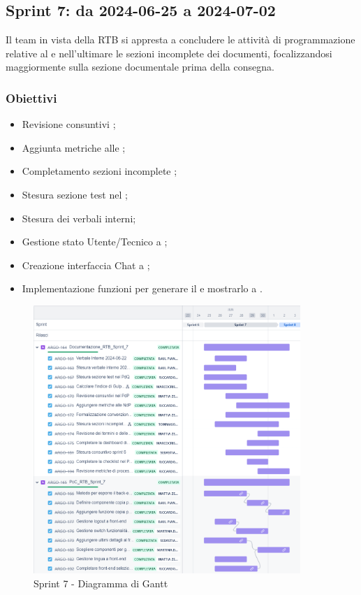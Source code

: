 \subsection{Sprint 7: da 2024-06-25 a 2024-07-02}
Il team in vista della RTB si appresta a concludere le attività di programmazione relative al  e nell'ultimare le sezioni incomplete dei documenti, focalizzandosi maggiormente sulla sezione documentale prima della consegna.


\subsubsection{Obiettivi}
\begin{itemize}
  \item Revisione consuntivi \PdP;
  \item Aggiunta metriche alle \NdP;
  \item Completamento sezioni incomplete \NdP;
  \item Stesura sezione test nel \PdQ;
  \item Stesura dei verbali interni;
  \item Gestione stato Utente/Tecnico a ;
  \item Creazione interfaccia Chat a ;
  \item Implementazione funzioni per generare il  e mostrarlo a .
\end{itemize}

\begin{figure}[H]
  \centering
  \includegraphics[width=0.90\textwidth]{assets/Pianificazione/Sprint-7/gantt.png}
  \caption{Sprint 7 - Diagramma di Gantt}\label{fig:sprint-7-gantt}
\end{figure}